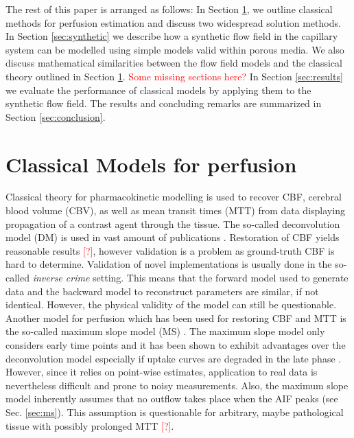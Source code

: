 \documentclass[paper=a4, fontsize=11pt,parskip=half,headings=small]{scrartcl}
\newcommand{\missingsource}{\textcolor{red}{[?]}}
\begin{document}
	The rest of this paper is arranged as follows: In Section \ref{sec:classical}, we outline classical methods for perfusion estimation and discuss two widespread solution methods. 
	In Section \ref{sec:synthetic} we describe how a synthetic flow field in the capillary system can be modelled using simple models valid within porous media. 
	We also discuss mathematical similarities between the flow field models and the classical theory outlined in Section \ref{sec:classical}. 
	\textcolor{red}{Some missing sections here?}
	In Section \ref{sec:results} we evaluate the performance of classical models by applying them to the synthetic flow field. 
	The results and concluding remarks are summarized in Section \ref{sec:conclusion}.
	
	
	
	\section{Classical Models for perfusion} \label{sec:classical}

	Classical theory for pharmacokinetic modelling is used to recover CBF, cerebral blood volume (CBV), as well as mean transit times (MTT) from data displaying propagation of a contrast agent through the tissue.
	The so-called deconvolution model (DM) is used in vast amount of publications \cite{ostergaard96,abels10,straka10,bivard13,sourbron13}.
	Restoration of CBF yields reasonable results \missingsource, however validation is a problem as ground-truth CBF is hard to determine.
	Validation of novel implementations is usually done in the so-called \emph{inverse crime} setting. 
	This means that the forward model used to generate data and the backward model to reconstruct parameters are similar, if not identical. However, the physical validity of the model can still be questionable.
	Another model for perfusion which has been used for restoring CBF and MTT is the so-called maximum slope model (MS) \cite{miles91,klotz99}.
	The maximum slope model only considers early time points and it has been shown to exhibit advantages over the deconvolution model especially if uptake curves are degraded in the late phase \cite{abels10}.
	However, since it relies on point-wise estimates, application to real data is nevertheless difficult and prone to noisy measurements.
	Also, the maximum slope model inherently assumes that no outflow takes place when the AIF peaks (see Sec. \ref{sec:ms}).
	This assumption is questionable for arbitrary, maybe pathological tissue with possibly prolonged MTT \missingsource.
	
\end{document}
